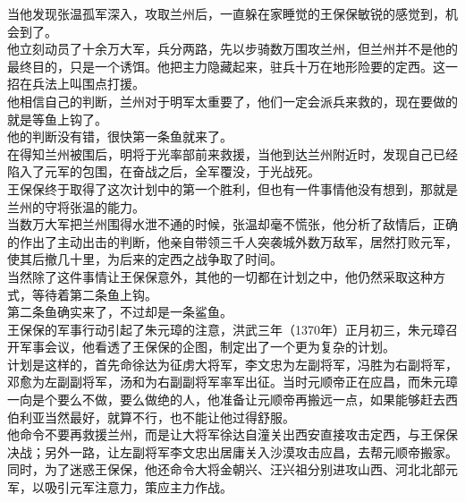 \begin{multicols}{\theparacolNo}
当他发现张温孤军深入，攻取兰州后，一直躲在家睡觉的王保保敏锐的感觉到，机会到了。\\

他立刻动员了十余万大军，兵分两路，先以步骑数万围攻兰州，但兰州并不是他的最终目的，只是一个诱饵。他把主力隐藏起来，驻兵十万在地形险要的定西。这一招在兵法上叫围点打援。\\

他相信自己的判断，兰州对于明军太重要了，他们一定会派兵来救的，现在要做的就是等鱼上钩了。\\

他的判断没有错，很快第一条鱼就来了。\\

在得知兰州被围后，明将于光率部前来救援，当他到达兰州附近时，发现自己已经陷入了元军的包围，在奋战之后，全军覆没，于光战死。\\

王保保终于取得了这次计划中的第一个胜利，但也有一件事情他没有想到，那就是兰州的守将张温的能力。\\

当数万大军把兰州围得水泄不通的时候，张温却毫不慌张，他分析了敌情后，正确的作出了主动出击的判断，他亲自带领三千人突袭城外数万敌军，居然打败元军，使其后撤几十里，为后来的定西之战争取了时间。\\

当然除了这件事情让王保保意外，其他的一切都在计划之中，他仍然采取这种方式，等待着第二条鱼上钩。\\

第二条鱼确实来了，不过却是一条鲨鱼。\\

王保保的军事行动引起了朱元璋的注意，洪武三年（1370年）正月初三，朱元璋召开军事会议，他看透了王保保的企图，制定出了一个更为复杂的计划。\\

计划是这样的，首先命徐达为征虏大将军，李文忠为左副将军，冯胜为右副将军，邓愈为左副副将军，汤和为右副副将军率军出征。当时元顺帝正在应昌，而朱元璋一向是个要么不做，要么做绝的人，他准备让元顺帝再搬远一点，如果能够赶去西伯利亚当然最好，就算不行，也不能让他过得舒服。\\

他命令不要再救援兰州，而是让大将军徐达自潼关出西安直接攻击定西，与王保保决战；另外一路，让左副将军李文忠出居庸关入沙漠攻击应昌，去帮元顺帝搬家。\\

同时，为了迷惑王保保，他还命令大将金朝兴、汪兴祖分别进攻山西、河北北部元军，以吸引元军注意力，策应主力作战。\\


\end{multicols}
